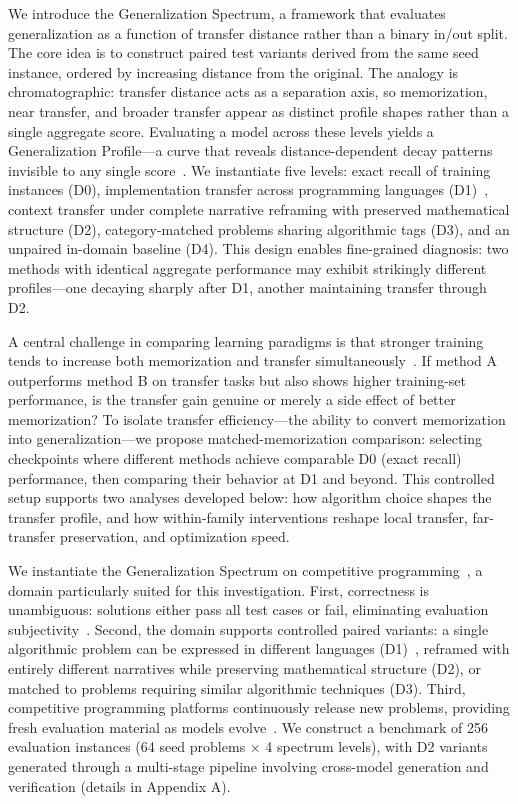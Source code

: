 \documentclass[]{bytedance_seed}
\theoremstyle{plain}
\theoremstyle{definition}
\theoremstyle{remark}
\begin{document}
We introduce the Generalization Spectrum, a framework that evaluates generalization as a function of transfer distance rather than a binary in/out split. The core idea is to construct paired test variants derived from the same seed instance, ordered by increasing distance from the original. The analogy is chromatographic: transfer distance acts as a separation axis, so memorization, near transfer, and broader transfer appear as distinct profile shapes rather than a single aggregate score. Evaluating a model across these levels yields a Generalization Profile---a curve that reveals distance-dependent decay patterns invisible to any single score~\citep{kaplan2020scaling}. We instantiate five levels: exact recall of training instances (D0), implementation transfer across programming languages (D1)~\citep{cassano2023multiple}, context transfer under complete narrative reframing with preserved mathematical structure (D2), category-matched problems sharing algorithmic tags (D3), and an unpaired in-domain baseline (D4). This design enables fine-grained diagnosis: two methods with identical aggregate performance may exhibit strikingly different profiles---one decaying sharply after D1, another maintaining transfer through D2.

A central challenge in comparing learning paradigms is that stronger training tends to increase both memorization and transfer simultaneously~\citep{power2022grokking, nakkiran2020deep}. If method A outperforms method B on transfer tasks but also shows higher training-set performance, is the transfer gain genuine or merely a side effect of better memorization? To isolate transfer efficiency---the ability to convert memorization into generalization---we propose matched-memorization comparison: selecting checkpoints where different methods achieve comparable D0 (exact recall) performance, then comparing their behavior at D1 and beyond. This controlled setup supports two analyses developed below: how algorithm choice shapes the transfer profile, and how within-family interventions reshape local transfer, far-transfer preservation, and optimization speed.

We instantiate the Generalization Spectrum on competitive programming~\citep{li2022competition, hendrycks2021apps, jain2024livecodebench}, a domain particularly suited for this investigation. First, correctness is unambiguous: solutions either pass all test cases or fail, eliminating evaluation subjectivity~\citep{chen2021evaluating}. Second, the domain supports controlled paired variants: a single algorithmic problem can be expressed in different languages (D1)~\citep{cassano2023multiple, peng2024humanevalxl}, reframed with entirely different narratives while preserving mathematical structure (D2), or matched to problems requiring similar algorithmic techniques (D3). Third, competitive programming platforms continuously release new problems, providing fresh evaluation material as models evolve~\citep{jain2024livecodebench}. We construct a benchmark of 256 evaluation instances (64 seed problems × 4 spectrum levels), with D2 variants generated through a multi-stage pipeline involving cross-model generation and verification (details in Appendix A).
\end{document}
